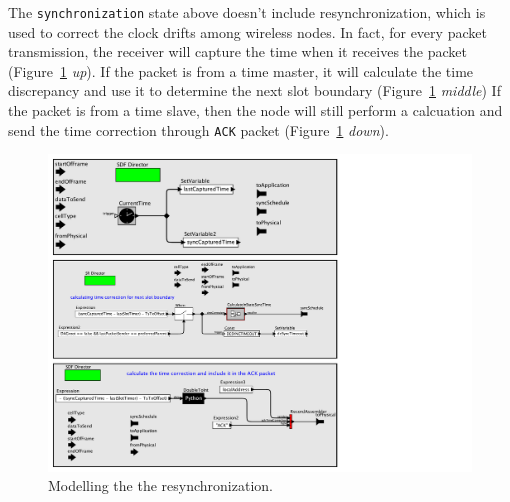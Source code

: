 The \texttt{synchronization} state above doesn't include resynchronization, which is used to correct the clock drifts among wireless nodes. In fact, for every packet transmission, the receiver will capture the time when it receives the packet (Figure~\ref{fig:timeCorrection} {\em up}). If the packet is from a time master, it will calculate the time discrepancy and use it to determine the next slot boundary (Figure~\ref{fig:timeCorrection} {\em middle}) If the packet is from a time slave, then the node will still perform a calcuation and send the time correction through \texttt{ACK} packet (Figure~\ref{fig:timeCorrection} {\em down}).

\begin{figure}[t]
\centering
\includegraphics[width=0.9\columnwidth]{figures/PaperReSynchronization}
\caption{Modelling the the resynchronization.}
\label{fig:timeCorrection}
\end{figure}

